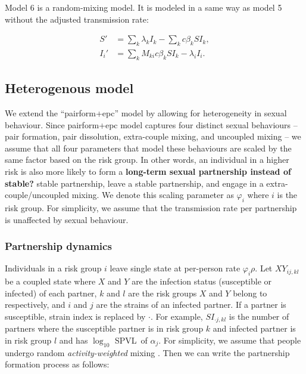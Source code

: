 \documentclass[10pt,letterpaper]{article}
\newcommand{\Lspvl}{$\log_{10}$ SPVL}
\newcommand{\todo}[1]{\textbf{#1}}
\begin{document}
Model 6 is a random-mixing model. It is modeled in a same way as model 5 without the adjusted transmission rate:

\begin{equation}
\begin{aligned}
S' & = \sum_k \lambda_k I_k - \sum_k c \beta_k S I_k,\\
I_i' & = \sum_k M_{ki} c \beta_k S I_k - \lambda_i I_i.
\end{aligned}
\end{equation}

\subsection*{Heterogenous model}

We extend the ``pairform+epc'' model by allowing for heterogeneity in sexual behaviour. Since pairform+epc model captures four distinct sexual behaviours -- pair formation, pair dissolution, extra-couple mixing, and uncoupled mixing -- we assume that all four parameters that model these behaviours are scaled by the same factor based on the risk group. In other words, an individual in a higher risk is also more likely to form a \todo{long-term sexual partnership instead of stable?} stable partnership, leave a stable partnership, and engage in a extra-couple/uncoupled mixing. We denote this scaling parameter as $\varphi_i$ where $i$ is the risk group. For simplicity, we assume that the transmission rate per partnership is unaffected by sexual behaviour.

\subsubsection*{Partnership dynamics}

Individuals in a risk group $i$ leave single state at per-person rate $\varphi_i \rho$. Let $XY_{ij,kl}$ be a coupled state where $X$ and $Y$ are the infection status (susceptible or infected) of each partner, $k$ and $l$ are the risk groups $X$ and $Y$ belong to respectively, and $i$ and $j$ are the strains of an infected partner. If a partner is susceptible, strain index is replaced by $\cdot$. For example, $SI_{\cdot j,kl}$ is the number of partners where the susceptible partner is in risk group $k$ and infected partner is in risk group $l$ and has \Lspvl\ of $\alpha_j$. For simplicity, we assume that people undergo random \emph{activity-weighted} mixing \cite{may_transmission_1988}. Then we can write the partnership formation process as follows:
\end{document}
